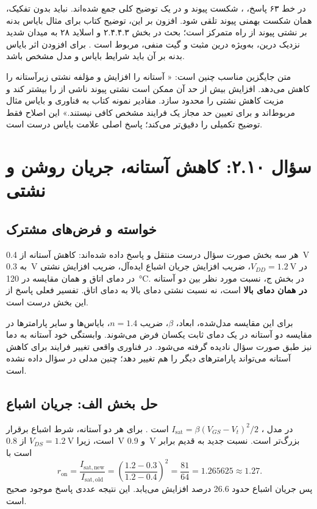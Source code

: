 \documentclass[12pt,a4paper]{article}
\newcommand{\exnum}[1]{\mbox{\beginL#1\endL}}
\begin{document}
در خط ۶۳ پاسخ، ، شکست پیوند و  در یک توضیح کلی جمع شده‌اند.  نباید بدون تفکیک، همان شکست بهمنی پیوند تلقی شود. افزون بر این، توضیح کتاب برای مثال بایاس بدنه بر نشتی پیوند از راه  متمرکز است؛ بحث  در بخش \exnum{۲.۴.۴.۳} و اسلاید ۲۸ به میدان شدید نزدیک درین، به‌ویژه درین مثبت و گیت منفی، مربوط است \cite[صفحات چاپی ۸۴ و ۲۰۰]{weste}\cite[اسلاید ۲۸]{nonideal}. برای افزودن اثر بایاس بدنه بر آن باید شرایط بایاس و مدل مشخص باشد.

متن جایگزین مناسب چنین است: « آستانه را افزایش و مؤلفه نشتی زیرآستانه را کاهش می‌دهد. افزایش بیش از حد آن ممکن است نشتی پیوند ناشی از  را بیشتر کند و مزیت کاهش نشتی را محدود سازد. مقادیر نمونه کتاب به فناوری و بایاس مثال مربوط‌اند و برای تعیین حد مجاز یک فرایند مشخص کافی نیستند.» این اصلاح فقط توضیح تکمیلی را دقیق‌تر می‌کند؛ پاسخ اصلی علامت بایاس درست است.

\section*{سؤال \exnum{۲.۱۰}: کاهش آستانه، جریان روشن و نشتی}
\subsection*{خواسته و فرض‌های مشترک}
هر سه بخش صورت سؤال درست منتقل و پاسخ داده شده‌اند: کاهش آستانه از \qty{0.4}{\volt} به \qty{0.3}{\volt} در \(V_{DD}=\qty{1.2}{\volt}\)، ضریب افزایش جریان اشباع ایده‌آل، ضریب افزایش نشتی در دمای اتاق و همان مقایسه در \qty{120}{\degreeCelsius}. در بخش ج، نسبت مورد نظر بین دو آستانه \textbf{در همان دمای بالا} است، نه نسبت نشتی دمای بالا به دمای اتاق. تفسیر فعلی پاسخ از این بخش درست است.

برای این مقایسه مدل‌شده، ابعاد، \(\beta\)، ضریب \(n=1.4\)، بایاس‌ها و سایر پارامترها در مقایسه دو آستانه در یک دمای ثابت یکسان فرض می‌شوند. وابستگی خود آستانه به دما نیز طبق صورت سؤال نادیده گرفته می‌شود. در فناوری واقعی تغییر فرایند برای کاهش آستانه می‌تواند پارامترهای دیگر را هم تغییر دهد؛ چنین مدلی در سؤال داده نشده است.

\subsection*{حل بخش الف: جریان اشباع}
در مدل ، \(I_{\mathrm{sat}}=\beta(V_{GS}-V_t)^2/2\) است \cite[رابطه \exnum{۲.۸}، صفحه چاپی ۶۶]{weste}. برای هر دو آستانه، شرط اشباع برقرار است، زیرا \(V_{DS}=\qty{1.2}{\volt}\) از \qty{0.8}{\volt} و \qty{0.9}{\volt} بزرگ‌تر است. نسبت جدید به قدیم برابر است با
\begin{equation}
 r_{\mathrm{on}}=\frac{I_{\mathrm{sat,new}}}{I_{\mathrm{sat,old}}}
 =\left(\frac{1.2-0.3}{1.2-0.4}\right)^2
 =\frac{81}{64}=1.265625\approx1.27.
 \label{eq:on-ratio}
\end{equation}
پس جریان اشباع حدود \num{26.6} درصد افزایش می‌یابد. این نتیجه عددی پاسخ موجود صحیح است.
\end{document}
